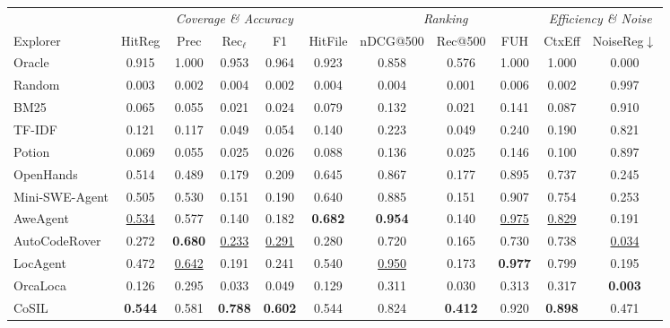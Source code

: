 \documentclass{llmxive}
\providecommand{\arraystretch}{1.18}
\begin{document}
\begin{table}[t]
  \centering
  \vspace{1mm}
  \scriptsize
  \renewcommand{\arraystretch}{1.10}
  \setlength{\tabcolsep}{4pt}
  \begin{tabular*}{\textwidth}{@{\extracolsep{\fill}} l ccccc ccc cc @{}}
    \toprule
    & \multicolumn{5}{c}{\textit{Coverage \& Accuracy}} & \multicolumn{3}{c}{\textit{Ranking}} & \multicolumn{2}{c}{\textit{Efficiency \& Noise}} \\
    \cmidrule(lr){2-6} \cmidrule(lr){7-9} \cmidrule(lr){10-11}
    Explorer
      & HitReg & Prec & Rec$_\ell$ & F1 & HitFile
      & nDCG@500 & Rec@500 & FUH
      & CtxEff & NoiseReg$\downarrow$ \\
    \midrule
    Oracle  & 0.915 & 1.000 & 0.953 & 0.964 & 0.923 & 0.858 & 0.576 & 1.000 & 1.000 & 0.000 \\
    Random  & 0.003 & 0.002 & 0.004 & 0.002 & 0.004 & 0.004 & 0.001 & 0.006 & 0.002 & 0.997 \\
    \midrule
    BM25    & 0.065 & 0.055 & 0.021 & 0.024 & 0.079 & 0.132 & 0.021 & 0.141 & 0.087 & 0.910 \\
    TF-IDF  & 0.121 & 0.117 & 0.049 & 0.054 & 0.140 & 0.223 & 0.049 & 0.240 & 0.190 & 0.821 \\
    Potion  & 0.069 & 0.055 & 0.025 & 0.026 & 0.088 & 0.136 & 0.025 & 0.146 & 0.100 & 0.897 \\
    \midrule
    OpenHands      & 0.514 & 0.489 & 0.179 & 0.209 & 0.645 & 0.867 & 0.177 & 0.895 & 0.737 & 0.245 \\
    Mini-SWE-Agent & 0.505 & 0.530 & 0.151 & 0.190 & 0.640 & 0.885 & 0.151 & 0.907 & 0.754 & 0.253 \\
    AweAgent       & \underline{0.534} & 0.577 & 0.140 & 0.182 & \textbf{0.682} & \textbf{0.954} & 0.140 & \underline{0.975} & \underline{0.829} & 0.191 \\
    AutoCodeRover  & 0.272 & \textbf{0.680} & \underline{0.233} & \underline{0.291} & 0.280 & 0.720 & 0.165 & 0.730 & 0.738 & \underline{0.034} \\
    LocAgent       & 0.472 & \underline{0.642} & 0.191 & 0.241 & 0.540 & \underline{0.950} & 0.173 & \textbf{0.977} & 0.799 & 0.195 \\
    OrcaLoca       & 0.126 & 0.295 & 0.033 & 0.049 & 0.129 & 0.311 & 0.030 & 0.313 & 0.317 & \textbf{0.003} \\
    CoSIL          & \textbf{0.544} & 0.581 & \textbf{0.788} & \textbf{0.602} & 0.544 & 0.824 & \textbf{0.412} & 0.920 & \textbf{0.898} & 0.471 \\

\end{tabular*}
\end{table}
\end{document}
